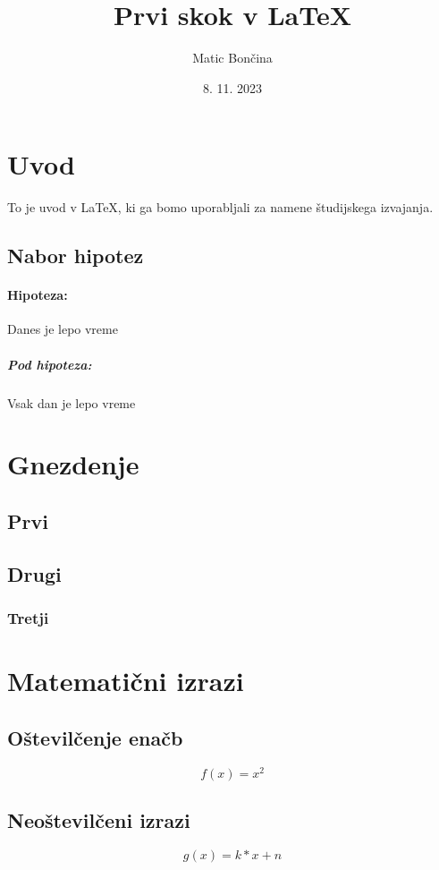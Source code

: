 \documentclass{article}
\title{Prvi skok v LaTeX}
\author{Matic Bončina}
\date{8. 11. 2023}
\begin{document}
\maketitle
{}
\newpage

\tableofcontents
\listoffigures
\listoftables
\newpage

\section{Uvod}
To je uvod v LaTeX, ki ga bomo uporabljali za namene študijskega izvajanja.

\subsection{Nabor hipotez}
\paragraph{Hipoteza:} Danes je lepo vreme
\subparagraph{Pod hipoteza:} Vsak dan je lepo vreme

\section{Gnezdenje}
\subsection{Prvi}
\subsection{Drugi}
\subsubsection{Tretji}

\section{Matematični izrazi}
\subsection{Oštevilčenje enačb}
\begin{equation}
    f(x) =  x^2
\end{equation}

\subsection{Neoštevilčeni izrazi}
\begin{equation*}
    g(x) = k*x + n
\end{equation*}
\end{document}

